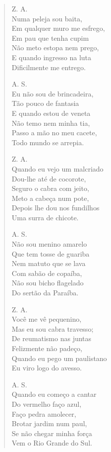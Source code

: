 \begin{verse}
Z. A.\\
Numa peleja sou baita,\\
Em qualquer muro me esfrego,\\
Em pau que tenha cupim\\
Não meto estopa nem prego,\\
E quando ingresso na luta\\
Dificilmente me entrego.

A. S.\\
Eu não sou de brincadeira,\\
Tão pouco de fantasia\\
E quando estou de veneta\\
Não temo nem minha tia,\\
Passo a mão no meu cacete,\\
Todo mundo se arrepia.
\pagebreak

Z. A.\\
Quando eu vejo um malcriado\\
Dou-lhe até de cocorote,\\
Seguro o cabra com jeito,\\
Meto a cabeça num pote,\\
Depois lhe dou nos fundilhos\\
Uma surra de chicote.

A. S.\\
Não sou menino amarelo\\
Que tem tosse de guariba\\
Nem matuto que se lava\\
Com sabão de copaíba,\\
Não sou bicho flagelado\\
Do sertão da Paraíba.

Z. A.\\
Você me vê pequenino,\\
Mas eu sou cabra travesso;\\
De reumatismo nas juntas\\
Felizmente não padeço,\\
Quando eu pego um paulistano\\
Eu viro logo do avesso.

A. S.\\
Quando eu começo a cantar\\
Do vermelho faço azul,\\
Faço pedra amolecer,\\
Brotar jardim num paul,\\
Se não chegar minha força\\
Vem o Rio Grande do Sul.
\pagebreak


\end{verse}
